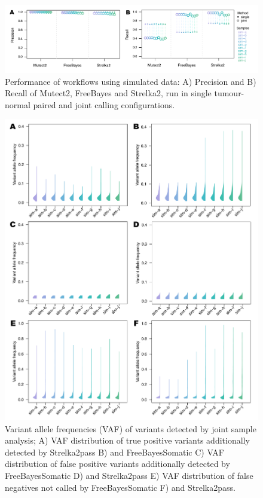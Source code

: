 \begin{figure}[!ht]
\centering
  \includegraphics[width=\textwidth]{Appendices/Variantcalling/supp/S2}
  \caption[Performance of workflows using simulated data]{Performance of workflows using simulated data: A) Precision and B) Recall of Mutect2, FreeBayes and Strelka2, run in single tumour-normal paired and joint calling configurations.}\label{A:fig:S02}
\end{figure}

\begin{figure}[!ht]
\centering
  \includegraphics[width=\textwidth]{Appendices/Variantcalling/supp/S3}
  \caption[Variant allele frequencies (VAF) of variants detected by joint sample analysis]{Variant allele frequencies (VAF) of variants detected by joint sample analysis; A) VAF distribution of true positive variants additionally detected by Strelka2pass B) and FreeBayesSomatic C) VAF distribution of false positive variants additionally detected by FreeBayesSomatic D) and Strelka2pass E) VAF distribution of false negatives not called by FreeBayesSomatic F) and Strelka2pass.}\label{A:fig:S03}
\end{figure}

